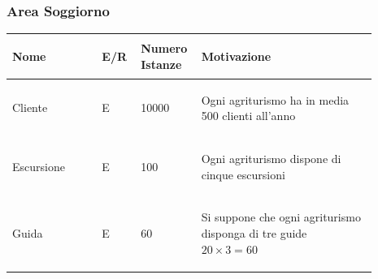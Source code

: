 \documentclass[12pt,a4paper]{article}
\begin{document}
\subsubsection{Area Soggiorno}
\begin{center}\setlength{\extrarowheight}{1.5pt}\begin{longtable}{|p{0.23\linewidth}|p{0.1\linewidth}|p{0.11\linewidth}|p{0.45\linewidth}|}
\hline \textbf{Nome}   & \begin{center}\vspace{-15pt}\textbf{E/R}\end{center} & \textbf{Numero Istanze} & \textbf{Motivazione}\\ 

    
\hline
Cliente
 & 
\begin{center}\vspace{-25pt}E\end{center}
 & 
\begin{center}\vspace{-25pt}10000\end{center}
 & 
\begin{flushleft}\vspace{-25pt}Ogni agriturismo ha in media 500 clienti all'anno\end{flushleft}
\\

\hline
Escursione
 & 
\begin{center}\vspace{-25pt}E\end{center}
 & 
\begin{center}\vspace{-25pt}100\end{center}
 & 
\begin{flushleft}\vspace{-25pt}Ogni agriturismo dispone di cinque escursioni\end{flushleft}
\\

\hline
Guida
 & 
\begin{center}\vspace{-25pt}E\end{center}
 & 
\begin{center}\vspace{-25pt}60\end{center}
 & 
\begin{flushleft}\vspace{-25pt}Si suppone che ogni agriturismo disponga di tre guide $20\times 3= 60$\end{flushleft}
\\


\end{longtable}
\end{center}
\end{document}
